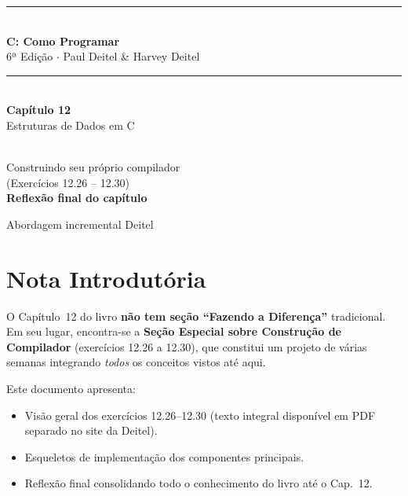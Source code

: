 \documentclass[12pt,a4paper]{article}
\begin{document}
\begin{titlepage}
  \centering\vspace*{2cm}
  {\color{deitelblue}\rule{\linewidth}{2pt}}\\[0.4cm]
  {\huge\bfseries\color{deitelblue}C: Como Programar}\\[0.2cm]
  {\large\color{deitelblue}6ª Edição $\cdot$ Paul Deitel \& Harvey Deitel}\\[0.2cm]
  {\color{deitelblue}\rule{\linewidth}{2pt}}\\[1cm]
  {\LARGE\bfseries Capítulo 12}\\[0.3cm]
  {\Large\color{deitelblue!80}Estruturas de Dados em C}\\[0.8cm]
  \begin{tcolorbox}[colback=ecolightgreen,colframe=ecogreen,width=0.85\linewidth]
    \\[0.3cm]
    {\normalsize Construindo seu próprio compilador\\
    (Exercícios 12.26 -- 12.30)\\[0.2cm]
    \textbf{Reflexão final do capítulo}}
  \end{tcolorbox}
  \vfill{\small Abordagem incremental Deitel}
\end{titlepage}

\tableofcontents\newpage

\section*{Nota Introdutória}

\begin{atencao}
O Capítulo~12 do livro \textbf{não tem seção ``Fazendo a Diferença''} tradicional.
Em seu lugar, encontra-se a \textbf{Seção Especial sobre Construção de Compilador}
(exercícios 12.26 a 12.30), que constitui um projeto de várias semanas integrando
\textit{todos} os conceitos vistos até aqui.

Este documento apresenta:
\begin{itemize}[noitemsep]
  \item Visão geral dos exercícios 12.26--12.30 (texto integral disponível em
  PDF separado no site da Deitel).
  \item Esqueletos de implementação dos componentes principais.
  \item Reflexão final consolidando todo o conhecimento do livro até o Cap.~12.
\end{itemize}
\end{atencao}
\end{document}
